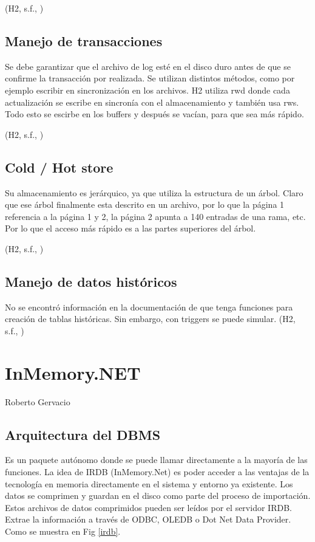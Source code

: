 \documentclass{acmart}
\begin{document}
(H2, s.f., \cite{h2backup})

\subsection{Manejo de transacciones}

Se debe garantizar que el archivo de log esté en el disco duro antes de que se confirme la transacción por realizada. Se utilizan distintos métodos, como por ejemplo escribir en sincronización en los archivos. H2 utiliza rwd donde cada actualización se escribe en sincronía con el almacenamiento y también usa rws. Todo esto se escirbe en los buffers y después se vacían, para que sea más rápido. 

(H2, s.f., \cite{h2advanced})

\subsection{Cold / Hot store}

Su almacenamiento es jerárquico, ya que utiliza la estructura de un árbol. Claro que ese árbol finalmente esta descrito en un archivo, por lo que la página 1 referencia a la página 1 y 2, la página 2 apunta a 140 entradas de una rama, etc. Por lo que el acceso más rápido es a las partes superiores del árbol. 

(H2, s.f., \cite{h2advanced})

\subsection{Manejo de datos históricos}

No se encontró información en la documentación de que tenga funciones para creación de tablas históricas.  Sin embargo, con triggers se puede simular. 
(H2, s.f., \cite{h2advanced})




\newpage

\section{InMemory.NET}
Roberto Gervacio
\subsection{Arquitectura del DBMS}

Es un paquete autónomo donde se puede llamar directamente a la mayoría de las funciones. La idea de IRDB (InMemory.Net) es poder acceder a las ventajas de la tecnología en memoria directamente en el sistema y entorno ya existente. Los datos se comprimen y guardan en el disco como parte del proceso de importación. Estos archivos de datos comprimidos pueden ser leídos por el servidor IRDB. Extrae la información a través de ODBC, OLEDB o Dot Net Data Provider. Como se muestra en Fig \ref{irdb}.
\end{document}
